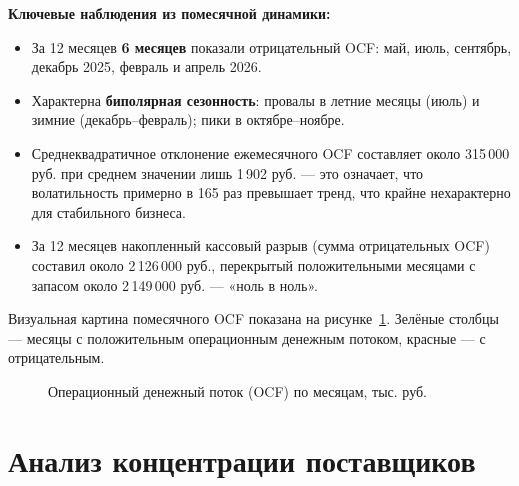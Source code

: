\textbf{Ключевые наблюдения из помесячной динамики:}
\begin{itemize}
  \item За 12 месяцев \textbf{6 месяцев} показали отрицательный OCF: май, июль, сентябрь, декабрь 2025, февраль и апрель 2026.
  \item Характерна \textbf{биполярная сезонность}: провалы в летние месяцы (июль) и зимние (декабрь--февраль); пики в октябре--ноябре.
  \item Среднеквадратичное отклонение ежемесячного OCF составляет около 315\,000 руб. при среднем значении лишь 1\,902 руб. --- это означает, что волатильность примерно в 165 раз превышает тренд, что крайне нехарактерно для стабильного бизнеса.
  \item За 12 месяцев накопленный кассовый разрыв (сумма отрицательных OCF) составил около 2\,126\,000 руб., перекрытый положительными месяцами с запасом около 2\,149\,000 руб. --- «ноль в ноль».
\end{itemize}

Визуальная картина помесячного OCF показана на рисунке~\ref{fig:monthly_ocf_chart}. Зелёные столбцы --- месяцы с положительным операционным денежным потоком, красные --- с отрицательным.

\begin{figure}[H]
\centering
{}
\caption{Операционный денежный поток (OCF) по месяцам, тыс. руб.}
\label{fig:monthly_ocf_chart}
\end{figure}

\section{Анализ концентрации поставщиков}


